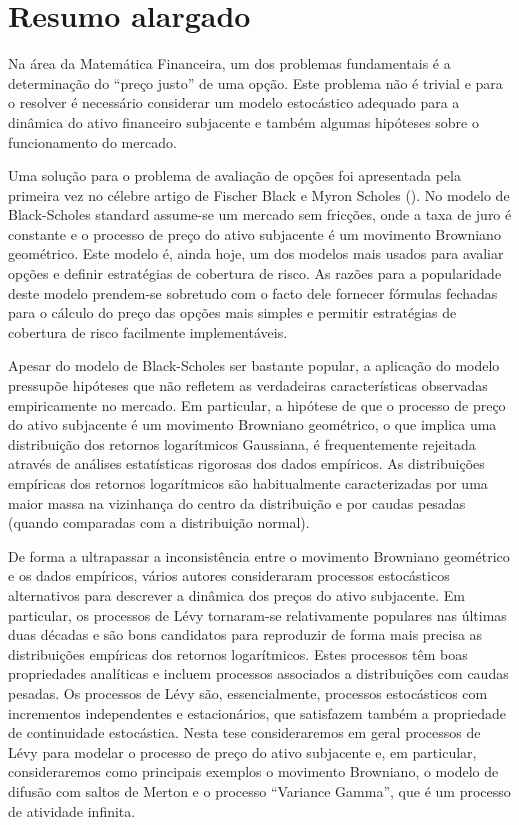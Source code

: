 
\chapter*{Resumo alargado}    


Na área da Matemática Financeira, um dos problemas fundamentais é a determinação do “preço justo” de uma opção. 
Este problema não é trivial e para o resolver é necessário considerar um modelo estocástico adequado para a dinâmica do ativo financeiro subjacente 
e também algumas hipóteses sobre o funcionamento do mercado. 

Uma solução para o problema de avaliação de opções foi apresentada pela primeira vez no célebre artigo de  Fischer Black e Myron Scholes (\cite{BS73}). 
No modelo de Black-Scholes standard assume-se um mercado sem fricções, onde a taxa de juro é constante e o processo de preço do ativo subjacente é um movimento Browniano geométrico. 
Este modelo é, ainda hoje, um dos modelos mais usados para avaliar opções e definir estratégias de cobertura de risco. 
As razões para a popularidade deste modelo prendem-se sobretudo com o facto dele fornecer fórmulas fechadas para o cálculo do preço das opções mais simples 
e permitir estratégias de cobertura de risco facilmente implementáveis. 

Apesar do modelo de Black-Scholes ser bastante popular, a aplicação do modelo pressupõe hipóteses que não refletem as verdadeiras características observadas empiricamente no mercado. 
Em particular, a hipótese de que o processo de preço do ativo subjacente é um movimento Browniano geométrico, o que implica uma distribuição dos retornos logarítmicos Gaussiana, 
é frequentemente rejeitada através de análises estatísticas rigorosas dos dados empíricos. 
As distribuições empíricas dos retornos logarítmicos são habitualmente caracterizadas por uma maior massa na vizinhança do centro da distribuição e por caudas pesadas 
(quando comparadas com a distribuição normal). 

De forma a ultrapassar a inconsistência entre o movimento Browniano geométrico e os dados empíricos, vários autores consideraram processos estocásticos alternativos 
para descrever a dinâmica dos preços do ativo subjacente. 
Em particular, os processos de Lévy tornaram-se relativamente populares nas últimas duas décadas e são bons candidatos para reproduzir de forma mais precisa as distribuições empíricas 
dos retornos logarítmicos. 
Estes processos têm boas propriedades analíticas e incluem processos associados a distribuições com caudas pesadas. 
Os processos de Lévy são, essencialmente, processos estocásticos com incrementos independentes e estacionários, que satisfazem também a propriedade de continuidade estocástica. 
Nesta tese consideraremos em geral processos de Lévy para modelar o processo de preço do ativo subjacente e, em particular, consideraremos como principais exemplos 
o movimento Browniano, o modelo de difusão com saltos de Merton e o processo “Variance Gamma”, que é um processo de atividade infinita.  

